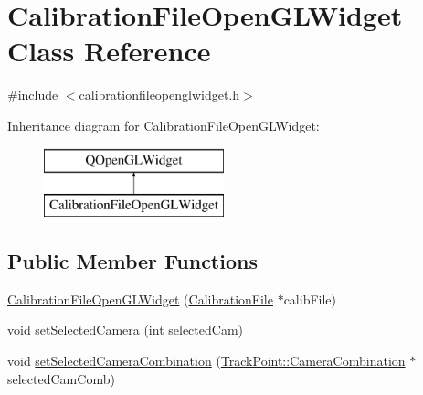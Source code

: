 \hypertarget{class_calibration_file_open_g_l_widget}{}\section{Calibration\+File\+Open\+G\+L\+Widget Class Reference}
\label{class_calibration_file_open_g_l_widget}


{\ttfamily \#include $<$calibrationfileopenglwidget.\+h$>$}

Inheritance diagram for Calibration\+File\+Open\+G\+L\+Widget\+:\begin{figure}[H]
\begin{center}
\leavevmode
\includegraphics[height=2.000000cm]{class_calibration_file_open_g_l_widget}
\end{center}
\end{figure}
\subsection*{Public Member Functions}
\begin{DoxyCompactItemize}
\item 
\mbox{\hyperlink{class_calibration_file_open_g_l_widget_a21217e2e4c89c63b115fdc9805a490d5}{Calibration\+File\+Open\+G\+L\+Widget}} (\mbox{\hyperlink{class_calibration_file}{Calibration\+File}} $\ast$calib\+File)
\item 
void \mbox{\hyperlink{class_calibration_file_open_g_l_widget_aa0b102d8cd7d90d41adb2bcb490eb9c8}{set\+Selected\+Camera}} (int selected\+Cam)
\item 
void \mbox{\hyperlink{class_calibration_file_open_g_l_widget_a99d70084688c048c2371cf055c7e4224}{set\+Selected\+Camera\+Combination}} (\mbox{\hyperlink{struct_track_point_1_1_camera_combination}{Track\+Point\+::\+Camera\+Combination}} $\ast$selected\+Cam\+Comb)
\end{DoxyCompactItemize}
